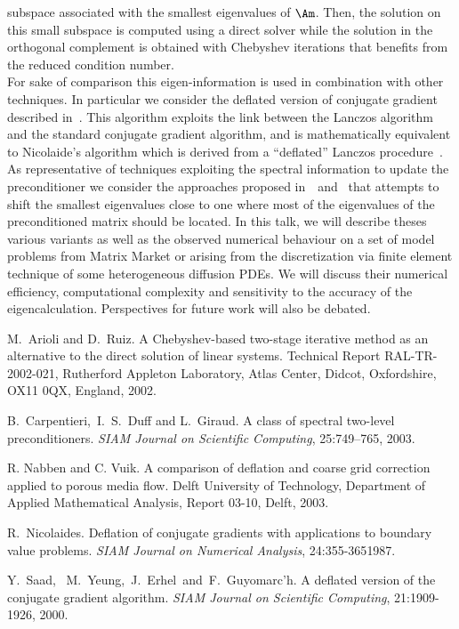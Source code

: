 \documentclass{report}
\begin{document}
subspace associated with the smallest eigenvalues of $\Am$.
Then, the solution on this small subspace is computed using a direct
solver while the solution in the orthogonal complement is obtained with
Chebyshev iterations that benefits from the reduced condition number.\\
For sake of comparison this eigen-information is used in combination with
other techniques.
In particular we consider the deflated version of conjugate gradient
described in~\cite{syeg:00}.
This algorithm exploits the link between the Lanczos algorithm and the
standard conjugate gradient algorithm, and is mathematically equivalent
to Nicolaide's algorithm which is derived from a ``deflated'' Lanczos
procedure~\cite{nico:87}.\\
As representative of techniques exploiting the spectral information to
update the preconditioner we consider the approaches proposed
in~\cite{cadg:03a}~and~\cite{navu:03} that attempts to shift the smallest
eigenvalues close to one where most of the eigenvalues of the
preconditioned matrix should be located.
In this talk, we will describe theses various variants as well as the
observed numerical behaviour on a set of model problems from Matrix
Market or arising from the discretization via finite element technique of
some heterogeneous diffusion PDEs.
We will discuss their numerical efficiency, computational complexity and
sensitivity to the accuracy of the eigencalculation.
Perspectives for future work will also be debated.
\begin{thebibliography}{99}
{M.~Arioli and D.~Ruiz}.
{A {C}hebyshev-based two-stage iterative method as an alternative to the
direct solution of linear systems}.
{Technical Report RAL-TR-2002-021, Rutherford Appleton Laboratory, Atlas
Center, Didcot, Oxfordshire, OX11 0QX, England, 2002}.

{B.~Carpentieri,~I.~S.~Duff and L.~Giraud}.
{A class of spectral two-level preconditioners}.
{\em SIAM {J}ournal on {S}cientific {C}omputing}, 25:{749--765}, 2003.

{R. Nabben and C. Vuik}.
{A comparison of deflation and coarse grid correction applied to porous media flow}.
{Delft University of Technology, Department of Applied Mathematical
Analysis}, {Report 03-10}, {Delft}, 2003.

{R.~Nicolaides}.
{Deflation of conjugate gradients with applications to boundary value problems}.
{\em SIAM Journal on Numerical Analysis}, 24:{355-365}1987.

{Y.~Saad,~ M.~Yeung,~J.~Erhel~and~F.~Guyomarc'h}.
{A deflated version of the conjugate gradient algorithm}.
{\em SIAM Journal on Scientific Computing}, 21:{1909-1926}, 2000.
\end{thebibliography}
\end{document}
